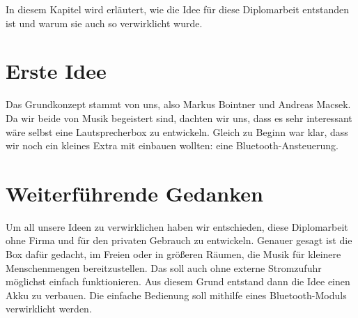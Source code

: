 In diesem Kapitel wird erläutert, wie die Idee für diese Diplomarbeit entstanden ist und warum sie auch so verwirklicht wurde.

\section{Erste Idee} \label{sec:1.1}
Das Grundkonzept stammt von uns, also Markus Bointner und Andreas Macsek. Da wir beide von Musik begeistert sind, dachten wir uns, dass es sehr interessant wäre selbst eine Lautsprecherbox zu entwickeln. Gleich zu Beginn war klar, dass wir noch ein kleines Extra mit einbauen wollten: eine Bluetooth-Ansteuerung.

\section{Weiterführende Gedanken} \label{sec:1.2}
Um all unsere Ideen zu verwirklichen haben wir entschieden, diese Diplomarbeit ohne Firma und für den privaten Gebrauch zu entwickeln. Genauer gesagt ist die Box dafür gedacht, im Freien oder in größeren Räumen, die Musik für kleinere Menschenmengen bereitzustellen. Das soll auch ohne externe Stromzufuhr möglichst einfach funktionieren. Aus diesem Grund entstand dann die Idee einen Akku zu verbauen. Die einfache Bedienung soll mithilfe eines Bluetooth-Moduls verwirklicht werden.
